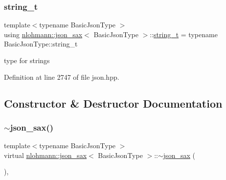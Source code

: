 \mbox{\label{structnlohmann_1_1json__sax_ae01977a9f3c5b3667b7a2929ed91061e}} 
\subsubsection{\texorpdfstring{string\_t}{string\_t}}
{\footnotesize\ttfamily template$<$typename Basic\+Json\+Type $>$ \\
using \mbox{\hyperlink{structnlohmann_1_1json__sax}{nlohmann\+::json\+\_\+sax}}$<$ Basic\+Json\+Type $>$\+::\mbox{\hyperlink{structnlohmann_1_1json__sax_ae01977a9f3c5b3667b7a2929ed91061e}{string\+\_\+t}} =  typename Basic\+Json\+Type\+::string\+\_\+t}



type for strings 



Definition at line 2747 of file json.\+hpp.



\subsection{Constructor \& Destructor Documentation}
\mbox{\label{structnlohmann_1_1json__sax_af31bacfa81aa7818d8639d1da65c8eb5}} 
\subsubsection{\texorpdfstring{$\sim$json\_sax()}{~json\_sax()}}
{\footnotesize\ttfamily template$<$typename Basic\+Json\+Type $>$ \\
virtual \mbox{\hyperlink{structnlohmann_1_1json__sax}{nlohmann\+::json\+\_\+sax}}$<$ Basic\+Json\+Type $>$\+::$\sim$\mbox{\hyperlink{structnlohmann_1_1json__sax}{json\+\_\+sax}} (\begin{DoxyParamCaption}{ }\end{DoxyParamCaption})\hspace{0.3cm}{\ttfamily [virtual]}, {\ttfamily [default]}}



